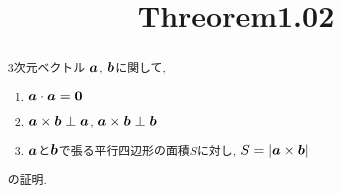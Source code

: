 \documentclass{jsarticle}
\title{Threorem1.02}
\newcommand*{\mbold}[1]{\mbox{\boldmath $#1$}}
\begin{document}
\maketitle

\begin{abstract}
  3次元ベクトル $\mbold{a}$, $\mbold{b}$に関して, 
  \begin{enumerate}
    \item $\mbold{a} \cdot \mbold{a} = \mbold{0}$
    \item $\mbold{a} \times \mbold{b} \perp \mbold{a}$, $\mbold{a} \times \mbold{b} \perp \mbold{b}$
    \item $\mbold{a}$と$\mbold{b}$で張る平行四辺形の面積$S$に対し, $S = |\mbold{a} \times \mbold{b}|$
  \end{enumerate}
  の証明. 
\end{abstract}
\end{document}

